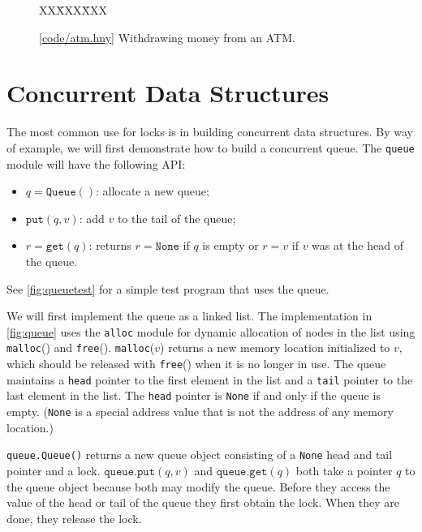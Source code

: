 \documentclass{report}
\newcommand{\harmonysource}[1]{
\begin{tabbing}
XX\=XXX\=XXX\kill
    
\end{tabbing}
}
\newcommand{\harmonylink}[1]{%
[\href{https://harmony.cs.cornell.edu/#1}{\underline{#1}}]%
}
\newenvironment{code}{
\tcolorbox
}{
\endtcolorbox
}
\begin{document}
\begin{figure}
\begin{code}
\harmonysource{atm}
\end{code}
\caption{\harmonylink{code/atm.hny} Withdrawing money from an ATM.}
\label{fig:atm}
\end{figure}

\chapter{Concurrent Data Structures}
\label{ch:cds}

The most common use for locks is in building concurrent data structures.
By way of example, we will first demonstrate how to build a concurrent queue.
The \texttt{queue} module will have the following API:
\begin{itemize}
\item $q = \mathtt{Queue}()$: allocate a new queue;
\item $\mathtt{put}(q, v)$: add $v$ to the tail of the queue;
\item $r = \mathtt{get}(q)$: returns $r = \mathtt{None}$
if $q$ is empty or $r = v$ if $v$ was at the head of the queue.
\end{itemize}
See \autoref{fig:queuetest} for a simple test program that uses the queue.

We will first implement the queue as a linked list.
The implementation in \autoref{fig:queue}
uses the \texttt{alloc} module for dynamic allocation
%
of nodes in the list using \texttt{malloc}() and \texttt{free}().
\texttt{malloc}($v$) returns a new memory location initialized to $v$,
which should be released with \texttt{free}() when it is no longer in use.
The queue maintains a \texttt{head} pointer to the first element in the list
and a \texttt{tail} pointer to the last element in the list.
The \texttt{head} pointer is \texttt{None} if and only if the queue is empty.
(\texttt{None} is a special address value that is not the address of any
memory location.)

\texttt{queue.Queue()} returns a new queue object consisting of a \texttt{None} head
and tail pointer and a lock.
$\mathtt{queue.put}(q, v)$ and $\mathtt{queue.get}(q)$ both take a pointer $q$ to the
queue object because both may modify the queue.
Before they access the value of the head or tail of the queue they first obtain
the lock.
When they are done, they release the lock.
\end{document}
